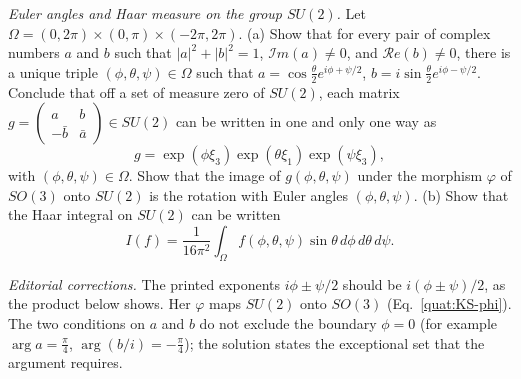 \begin{exercise}
\emph{Euler angles and Haar measure on the group $SU(2)$.}
Let $\Omega=(0,2\pi)\times(0,\pi)\times(-2\pi,2\pi)$.
(a) Show that for every pair of complex numbers $a$ and $b$ such that
$|a|^2+|b|^2=1$, $\mathcal Im(a)\ne0$, and $\mathcal Re(b)\ne0$, there is a
unique triple $(\phi,\theta,\psi)\in\Omega$ such that
$a=\cos\frac\theta2e^{i\phi+\psi/2}$, $b=i\sin\frac\theta2e^{i\phi-\psi/2}$.
Conclude that off a set of measure zero of $SU(2)$, each matrix
$g=\left(\begin{smallmatrix}a&b\\-\bar b&\bar a\end{smallmatrix}\right)\in SU(2)$
can be written in one and only one way as
\[
 g=\exp(\phi\xi_3)\exp(\theta\xi_1)\exp(\psi\xi_3),
\]
with $(\phi,\theta,\psi)\in\Omega$. Show that the image of
$g(\phi,\theta,\psi)$ under the morphism $\varphi$ of $SO(3)$ onto $SU(2)$
is the rotation with Euler angles $(\phi,\theta,\psi)$.
(b) Show that the Haar integral on $SU(2)$ can be written
\[
 I(f)=\frac1{16\pi^2}\int_\Omega f(\phi,\theta,\psi)\sin\theta\,
 d\phi\,d\theta\,d\psi.
\]
\end{exercise}
\emph{Editorial corrections.} The printed exponents $i\phi\pm\psi/2$ should
be $i(\phi\pm\psi)/2$, as the product below shows. Her $\varphi$ maps
$SU(2)$ onto $SO(3)$ (Eq.~\eqref{quat:KS-phi}). The two conditions on $a$
and $b$ do not exclude the boundary $\phi=0$ (for example
$\arg a=\frac\pi4$, $\arg(b/i)=-\frac\pi4$); the solution states the
exceptional set that the argument requires.
